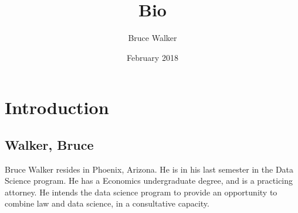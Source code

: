 \documentclass{article}
\title{Bio}
\author{Bruce Walker }
\date{February 2018}
\begin{document}
\maketitle

\section{Introduction}
\subsection{Walker, Bruce}

Bruce Walker resides in Phoenix, Arizona.  He is in his last semester in the Data Science program.  He has a Economics undergraduate degree, and is a practicing attorney.  He intends the data science program to provide an opportunity to combine law and data science, in a consultative capacity. 
\end{document}
